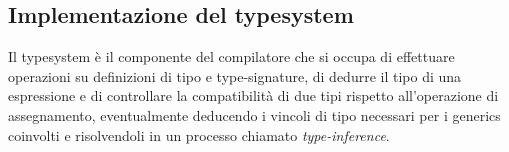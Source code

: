 \subsection{Implementazione del typesystem}
Il typesystem è il componente del compilatore che si occupa di effettuare operazioni su definizioni di tipo e 
type-signature, di dedurre il tipo di una espressione e di controllare la compatibilità di due tipi rispetto 
all'operazione di assegnamento, eventualmente deducendo i vincoli di tipo necessari per i generics coinvolti e risolvendoli
in un processo chiamato \textit{type-inference}.






\newpage